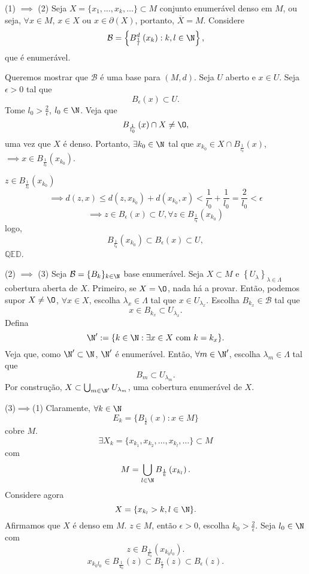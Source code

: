 \begin{demo}
    (1) $\implies$ (2)
    Seja $X=\{x_1,\ldots,x_k,\ldots\} \subset M$ conjunto enumerável denso em $M$, ou seja, $\forall x \in M$, $x\in X$ ou $x \in \partial\left( X \right)$, portanto, $\overline{X}=M$. Considere \[
    \mathcal{B} = \left\{ B_{\frac{1}{l}}^{d}\left( x_k \right) : k,l\in \N \right\} 
    ,\] que é enumerável.

    Queremos mostrar que $\mathcal{B}$ é uma base para $\left( M,d \right) $. Seja $U$ aberto e $x\in U$. Seja $\epsilon>0$ tal que \[
    B_{\epsilon}\left( x \right) \subset U
    .\] Tome $l_0>\frac{2}{\epsilon}$, $l_0\in \N$. Veja que \[
    B_{\frac{1}{l_0}}\left( x \right) \cap X \neq \O
    ,\] uma vez que $X$ é denso. Portanto, $\exists k_0\in \N$ tal que $x_{k_0}\in X\cap B_{\frac{1}{l_0}}\left( x \right) $, $\implies x\in B_{\frac{1}{l_0}}\left( x_{k_0} \right)$. 

    $z\in B_{\frac{1}{l_0}}\left( x_{k_0} \right) $ \[
    \implies d\left( z,x \right) \le d\left( z, x_{k_0} \right) +d\left( x_{k_0},x \right) <\frac{1}{l_0} + \frac{1}{l_0} = \frac{2}{l_0} < \epsilon
    \] \[
    \implies z\in B_{\epsilon}\left( x \right) \subset U, \forall z\in B_{\frac{1}{l_0}}\left( x_{k_{0}} \right)
    \] logo, \[
    B_{\frac{1}{l_0}}\left( x_{k_{0}} \right) \subset B_\epsilon\left( x \right) \subset U
    ,\] $\mathbb{QED}$.

    (2) $\implies$ (3)
    Seja $\mathcal{B} = \{B_k\} _{k\in \N}$ base enumerável. Seja $X\subset M$ e $\left\{ U_{\lambda} \right\} _{\lambda\in \Lambda}$ cobertura aberta de $X$. Primeiro, se $X=\O $, nada há a provar. Então, podemos supor $X\neq \O $, $\forall x\in X$, escolha $\lambda_x \in \Lambda$ tal que $x\in U_{\lambda_x}$. Escolha $B_{k_x}\in \mathcal{B}$ tal que \[
    x\in B_{k_x}\subset U_{\lambda_x}
    .\]
    Defina \[
    \N' := \{k\in \N : \exists x\in X \text{ com } k=k_x\} 
    .\] Veja que, como $\N'\subset \N$, $\N'$ é enumerável. Então, $\forall m\in \N'$, escolha $\lambda_m\in \Lambda$ tal que \[
    B_m\subset U_{\lambda_m}
    .\] Por construção, $X\subset \bigcup_{m\in \N'} U_{\lambda_m}$, uma cobertura enumerável de $X$.

    (3)$\implies$(1)
    Claramente, $\forall k\in \N$ \[
    E_k = \{B_{\frac{1}{k}}\left( x \right) : x\in M\} 
    \] cobre $M$. \[
    \exists  X_k = \{x_{k_1}, x_{k_2},\ldots,x_{k_l},\ldots\} \subset M
    \] com \[
    M = \bigcup_{l\in \N} B_{\frac{1}{k}}\left( x_{k_l} \right) 
    .\] 
    Considere agora \[
    X = \{x_{k_l} > k,l \in \N\} 
    .\] Afirmamos que $X$ é denso em $M$. $z\in M$, então $\epsilon>0$, escolha $k_0>\frac{2}{\epsilon}$. Seja $l_0\in \N$ com \[
    z\in B_{\frac{1}{k_0}}\left( x_{k_0 l_0} \right) 
    .\] \[
    x_{k_0 l_0} \in B_{\frac{1}{k_0}}\left( z \right)\subset B_{\frac{\epsilon}{2}} \left( z \right)\subset B_{\epsilon} \left( z \right) 
    .\] 
\end{demo}

